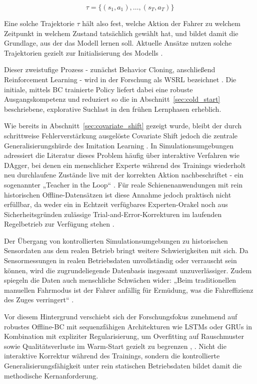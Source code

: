\begin{equation}
    \tau = \{(s_1, a_1), \dots, (s_T, a_T)\}
    \label{eq:trajectory}
\end{equation}

Eine solche Trajektorie $\tau$ hält also fest, welche Aktion der Fahrer zu welchem Zeitpunkt in welchem Zustand tatsächlich gewählt hat, und bildet damit die Grundlage, aus der das Modell lernen soll. Aktuelle Ansätze nutzen solche Trajektorien gezielt zur Initialisierung des Modells \cite[S.~2]{chap3_Lyu26}.

Dieser zweistufige Prozess - zunächst Behavior Cloning, anschließend Reinforcement Learning - wird in der Forschung als \gls{WSRL} bezeichnet \cite[vgl.~S.~1]{chap1_Wexler22}. Die initiale, mittels \gls{BC} trainierte Policy liefert dabei eine robuste Ausgangskompetenz und reduziert so die in Abschnitt~\ref{sec:cold_start} beschriebene, explorative Suchlast in den frühen Lernphasen erheblich.

Wie bereits in Abschnitt~\ref{sec:covariate_shift} gezeigt wurde, bleibt der durch schrittweise Fehlerverstärkung ausgelöste Covariate Shift jedoch die zentrale Generalisierungshürde des Imitation Learning \cite[vgl.~S.~1]{chap3_Seo24}. In Simulationsumgebungen adressiert die Literatur dieses Problem häufig über interaktive Verfahren wie \gls{DAgger}, bei denen ein menschlicher Experte während des Trainings wiederholt neu durchlaufene Zustände live mit der korrekten Aktion nachbeschriftet - ein sogenannter „Teacher in the Loop“ \cite[S.~1]{chap3_Cha21}. Für reale Schienenanwendungen mit rein historischen Offline-Datensätzen ist diese Annahme jedoch praktisch nicht erfüllbar, da weder ein in Echtzeit verfügbares Experten-Orakel noch aus Sicherheitsgründen zulässige Trial-and-Error-Korrekturen im laufenden Regelbetrieb zur Verfügung stehen \cite[S.~1]{chap3_Cha21}.

Der Übergang von kontrollierten Simulationsumgebungen zu historischen Sensordaten aus dem realen Betrieb bringt weitere Schwierigkeiten mit sich. Da Sensormessungen in realen Betriebsdaten unvollständig oder verrauscht sein können, wird die zugrundeliegende Datenbasis insgesamt unzuverlässiger. Zudem spiegeln die Daten auch menschliche Schwächen wider: „Beim traditionellen manuellen Fahrmodus ist der Fahrer anfällig für Ermüdung, was die Fahreffizienz des Zuges verringert“ \cite[S.~1]{chap3_Liu19}.

Vor diesem Hintergrund verschiebt sich der Forschungsfokus zunehmend auf robustes Offline-\gls{BC} mit sequenzfähigen Architekturen wie \glspl{LSTM} oder \glspl{GRU} in Kombination mit expliziter Regularisierung, um Overfitting auf Rauschmuster sowie Qualitätsverluste im Warm-Start gezielt zu begrenzen \cite[S.~2]{chap3_Lyu26}, \cite[vgl.~S.~1f.~u.~S.~6]{chap1_Wexler22}. Nicht die interaktive Korrektur während des Trainings, sondern die kontrollierte Generalisierungsfähigkeit unter rein statischen Betriebsdaten bildet damit die methodische Kernanforderung.

